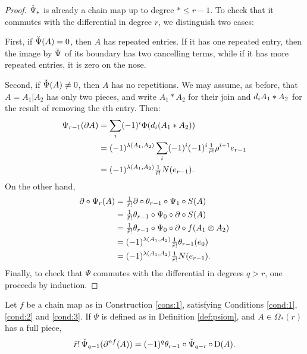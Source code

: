 \begin{proof}
	$\operatorname{\check{\Psi}}_*$ is already a chain map up to degree $*\leq r-1$. To check that it commutes with the differential in degree $r$, we distinguish two cases:

	First, if $\operatorname{\check{\Psi}}(A) = 0$, then $A$ has repeated entries. If it has one repeated entry, then the image by $\operatorname{\check{\Psi}}$ of its boundary has two cancelling terms, while if it has more repeated entries, it is zero on the nose.

	Second, if $\operatorname{\check{\Psi}}(A)\neq 0$, then $A$ has no repetitions. We may assume, as before, that $A = A_1|A_2$ has only two pieces, and write $A_1*A_2$ for their join and $d_iA_1*A_2$ for the result of removing the $i$th entry. Then:
	\begin{align*}
		\Psi_{r-1}(\partial A)
		&= \sum_i (-1)^i \Phi(d_i(A_1*A_2))
		\\
		&= (-1)^{\lambda(A_1,A_2)}\sum_i (-1)^i(-1)^{i}{\textstyle\frac{1}{\tilde{r}!}}\rho^{i+1} e_{r-1}
		\\
		&= (-1)^{\lambda(A_1,A_2)} {\textstyle\frac{1}{\tilde{r}!}} N(e_{r-1}).
	\end{align*}
	On the other hand,
	\begin{align*}
		\partial \circ \Psi_r(A) &= {\textstyle\frac{1}{\tilde{r}!}}\partial \circ \theta_{r-1}\circ \Psi_1\circ S(A)
		\\
		&= {\textstyle\frac{1}{\tilde{r}!}}\theta_{r-1}\circ \Psi_0\circ \partial\circ S(A)
		\\
		&= {\textstyle\frac{1}{\tilde{r}!}}\theta_{r-1}\circ \Psi_0\circ \partial\circ f(A_1 \otimes A_2)
		\\
		&= (-1)^{\lambda(A_1,A_2)}{\textstyle\frac{1}{\tilde{r}!}} \theta_{r-1}(e_0)
		\\
		&= (-1)^{\lambda(A_1,A_2)}{\textstyle\frac{1}{\tilde{r}!}} N(e_{r-1}).
	\end{align*}
	Finally, to check that $\Psi$ commutes with the differential in degrees $q>r$, one proceeds by induction.
\end{proof}


\begin{proposition}\label{prop:condition}
	Let $f$ be a chain map as in Construction \ref{cons:1}, satisfying Conditions \eqref{cond:1}, \eqref{cond:2} and \eqref{cond:3}. If $\Psi$ is defined as in Definition \ref{def:psiom}, and $A\in \Omega_*(r)$ has a full piece,
	\[
	\tilde{r}!\operatorname{\check{\Psi}}_{q-1}(\partial^{nf} (A)) = (-1)^q\theta_{r-1}\circ \operatorname{\check{\Psi}}_{q-r}\circ\operatorname{D}(A).
	\]
\end{proposition}

